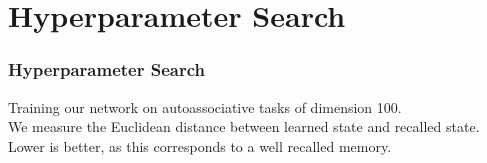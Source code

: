 \section{Hyperparameter Search}



\begin{frame}
    \frametitle{Hyperparameter Search}
    Training our network on autoassociative tasks of dimension 100. \\

    We measure the Euclidean distance between learned state and recalled state. Lower is better, as this corresponds to a well recalled memory.
\end{frame}


